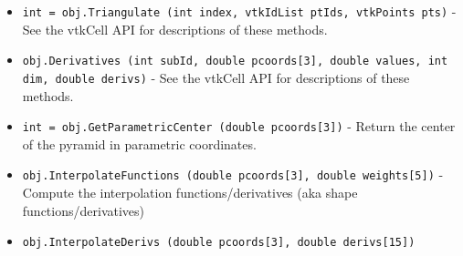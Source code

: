 \begin{itemize}
\item  \verb|int = obj.Triangulate (int index, vtkIdList ptIds, vtkPoints pts)| -  See the vtkCell API for descriptions of these methods.

\item  \verb|obj.Derivatives (int subId, double pcoords[3], double values, int dim, double derivs)| -  See the vtkCell API for descriptions of these methods.

\item  \verb|int = obj.GetParametricCenter (double pcoords[3])| -  Return the center of the pyramid in parametric coordinates.

\item  \verb|obj.InterpolateFunctions (double pcoords[3], double weights[5])| -  Compute the interpolation functions/derivatives
 (aka shape functions/derivatives)

\item  \verb|obj.InterpolateDerivs (double pcoords[3], double derivs[15])|

\end{itemize}
